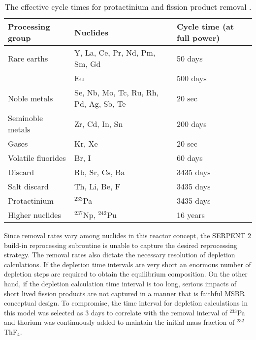 \begin{table}[ht!]
        \centering
        \caption{The effective cycle times for protactinium and fission product removal \cite{robertson_conceptual_1971}.}
        \begin{tabular}{|m{} | m{}|m{}|}
        \hline 
        Processing group & \qquad Nuclides & Cycle time (at full power) \\ [5pt] \hline 
        Rare earths & Y, La, Ce, Pr, Nd, Pm, Sm, Gd & 50 days \\ [5pt] \hline 
        \qquad & Eu & 500 days \\ [5pt] \hline
        Noble metals & Se, Nb, Mo, Tc, Ru, Rh, Pd, Ag, Sb, Te & 20 sec \\ [5pt] \hline
        Seminoble metals & Zr, Cd, In, Sn & 200 days \\ [5pt] \hline
        Gases & Kr, Xe & 20 sec \\ [5pt] \hline
        Volatile fluorides & Br, I & 60 days \\ [5pt] \hline
        Discard & Rb, Sr, Cs, Ba & 3435 days \\ [5pt] \hline
        Salt discard & Th, Li, Be, F & 3435 days \\ [5pt] \hline
        Protactinium & $^{233}$Pa & 3435 days \\ [5pt] \hline
        Higher nuclides & $^{237}$Np, $^{242}$Pu & 16 years \\ [5pt] \hline
        \end{tabular}
        \label{tab:reprocessing_list}
          \vspace{-0.9em}
\end{table}
Since removal rates vary among nuclides in this reactor concept, the SERPENT 2 build-in reprocessing subroutine is unable to capture the desired reprocessing strategy. The removal rates also dictate the necessary resolution of depletion 
calculations. If the depletion time intervals are very short an enormous number of depletion steps are required to obtain the equilibrium composition. On the other hand, if the depletion  calculation time interval is too long, serious impacts of short lived fission products are not captured in a manner that is faithful \gls{MSBR} conceptual design. To compromise, the time interval for depletion calculations in this model was selected as 3 days to correlate with the removal interval of $^{233}$Pa and thorium was continuously added to maintain the initial mass fraction of $^{232}$ThF$_4$.

